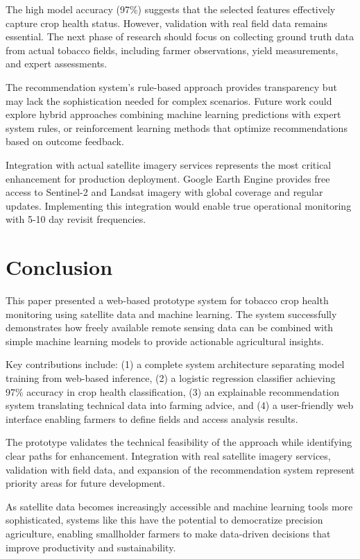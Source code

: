 \documentclass[journal]{IEEEtran}
\begin{document}
The high model accuracy (97\%) suggests that the selected features effectively capture crop health status. However, validation with real field data remains essential. The next phase of research should focus on collecting ground truth data from actual tobacco fields, including farmer observations, yield measurements, and expert assessments.

The recommendation system's rule-based approach provides transparency but may lack the sophistication needed for complex scenarios. Future work could explore hybrid approaches combining machine learning predictions with expert system rules, or reinforcement learning methods that optimize recommendations based on outcome feedback.

Integration with actual satellite imagery services represents the most critical enhancement for production deployment. Google Earth Engine provides free access to Sentinel-2 and Landsat imagery with global coverage and regular updates. Implementing this integration would enable true operational monitoring with 5-10 day revisit frequencies.

\section{Conclusion}

This paper presented a web-based prototype system for tobacco crop health monitoring using satellite data and machine learning. The system successfully demonstrates how freely available remote sensing data can be combined with simple machine learning models to provide actionable agricultural insights.

Key contributions include: (1) a complete system architecture separating model training from web-based inference, (2) a logistic regression classifier achieving 97\% accuracy in crop health classification, (3) an explainable recommendation system translating technical data into farming advice, and (4) a user-friendly web interface enabling farmers to define fields and access analysis results.

The prototype validates the technical feasibility of the approach while identifying clear paths for enhancement. Integration with real satellite imagery services, validation with field data, and expansion of the recommendation system represent priority areas for future development.

As satellite data becomes increasingly accessible and machine learning tools more sophisticated, systems like this have the potential to democratize precision agriculture, enabling smallholder farmers to make data-driven decisions that improve productivity and sustainability.
\end{document}
